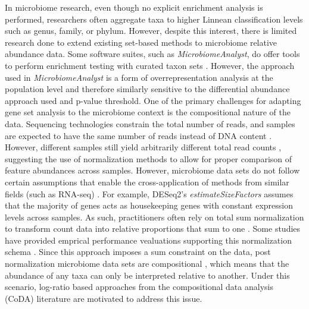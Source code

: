 \documentclass[10pt,letterpaper]{article}
\begin{document}


In microbiome research, even though no explicit enrichment analysis is performed, researchers often aggregate taxa to higher Linnean classification levels such as genus, family, or phylum. However, despite this interest, there is limited research done to extend existing set-based methods to microbiome relative abundance data. Some software suites, such as \emph{MicrobiomeAnalyst}, do offer tools to perform enrichment testing with curated taxon sets \cite{chong2020}. However, the approach used in \emph{MicrobiomeAnalyst} is a form of overrepresentation analysis at the population level and therefore similarly sensitive to the differential abundance approach used and p-value threshold. One of the primary challenges for adapting gene set analysis to the microbiome context is the compositional nature of the data. Sequencing technologies constrain the total number of reads, and samples are expected to have the same number of reads instead of DNA content \cite{quinn2019, quinn2018}. However, different samples still yield arbitrarily different total read counts \cite{morton2019, gloor2017}, suggesting the use of normalization methods to allow for proper comparison of feature abundances across samples. However, microbiome data sets do not follow certain assumptions that enable the cross-application of methods from similar fields (such as RNA-seq) \cite{quinn2019, quinn2018}. For example, DESeq2's \emph{estimateSizeFactors} \cite{love2014} assumes that the majority of genes acts as housekeeping genes with constant expression levels across samples. As such, practitioners often rely on total sum normalization to transform count data into relative proportions that sum to one \cite{weiss2017}. Some studies have provided emprical performance vealuations supporting this normalization schema \cite{mcknight2019}. Since this approach imposes a sum constraint on the data, post normalization microbiome data sets are compositional \cite{gloor2017}, which means that the abundance of any taxa can only be interpreted relative to another. Under this scenario, log-ratio based approaches from the compositional data analysis (CoDA) literature \cite{aitchison1994} are motivated to address this issue. 
\end{document}
